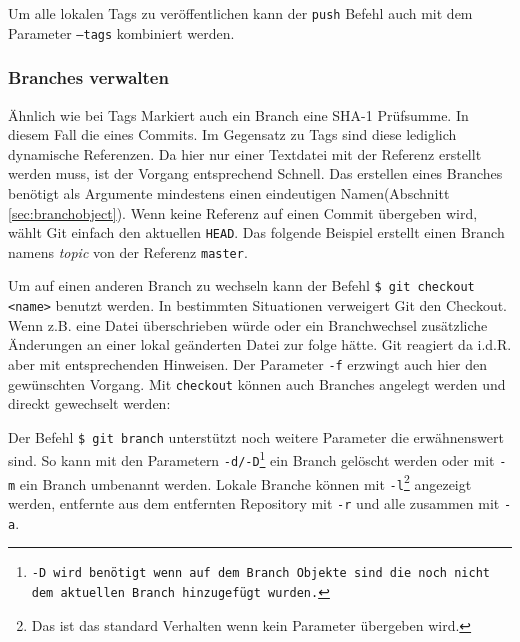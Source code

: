 

Um alle lokalen Tags zu veröffentlichen kann der \texttt{push} Befehl auch mit
dem Parameter \texttt{--tags} kombiniert werden.\cite[70-71,162-163]{gitosp}



\subsubsection{Branches verwalten} Ähnlich wie bei Tags Markiert auch ein
Branch eine \gls{SHA-1} Prüfsumme. In diesem Fall die eines Commits. Im
Gegensatz zu Tags sind diese lediglich dynamische Referenzen. Da hier nur einer
Textdatei mit der Referenz erstellt werden muss, ist der Vorgang entsprechend
Schnell. Das erstellen eines Branches benötigt als Argumente mindestens einen
eindeutigen Namen(Abschnitt \ref{sec:branchobject}). Wenn keine Referenz auf
einen Commit übergeben wird, wählt Git einfach den aktuellen \texttt{HEAD}.
Das folgende Beispiel erstellt einen Branch namens \textit{topic} von der
Referenz \texttt{master}.



Um auf einen anderen Branch zu wechseln kann der Befehl \texttt{\$ git checkout
<name>} benutzt werden. In bestimmten Situationen verweigert Git den Checkout.
Wenn z.B. eine Datei überschrieben würde oder ein Branchwechsel zusätzliche
Änderungen an einer lokal geänderten Datei zur folge hätte. Git reagiert da
i.d.R. aber mit entsprechenden Hinweisen. Der Parameter \texttt{-f} erzwingt
auch hier den gewünschten Vorgang. Mit \texttt{checkout} können auch Branches
angelegt werden und direckt gewechselt werden:



Der Befehl \texttt{\$ git branch} unterstützt noch weitere Parameter die
erwähnenswert sind. So kann mit den Parametern
\texttt{-d/-D}\footnote{\texttt{-D wird benötigt wenn auf dem Branch Objekte
sind die noch nicht dem aktuellen Branch hinzugefügt wurden.}} ein Branch
gelöscht werden oder mit \texttt{-m} ein Branch umbenannt werden. Lokale
Branche können mit \texttt{-l}\footnote{Das ist das standard Verhalten wenn kein
Parameter übergeben wird.} angezeigt werden, entfernte aus dem entfernten
Repository mit \texttt{-r} und alle zusammen mit
\texttt{-a}.\cite[65-67]{gitosp}

